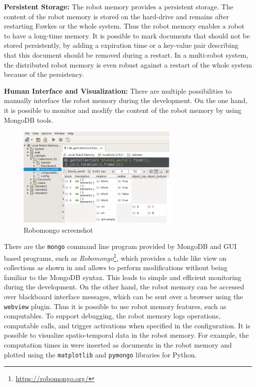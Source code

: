 \textbf{Persistent Storage:}
The robot memory provides a persistent storage. The content of the
robot memory is stored on the hard-drive and remains after restarting
Fawkes or the whole system. Thus the robot memory enables a robot to
have a long-time memory. It is possible to mark documents that should
not be stored persistently, by adding a expiration time or a key-value
pair describing that this document should be removed during a restart.
In a multi-robot system, the distributed robot memory is even robust against a
restart of the whole system because of the persistency.

\textbf{Human Interface and Visualization:}
There are multiple possibilities to manually interface the robot
memory during the development. On the one hand, it is possible to
monitor and modify the content of the robot memory by using MongoDB
tools.
\begin{figure}
  \centering
  \vspace{-4mm}
  \includegraphics[width=0.7\textwidth]{img/robomongo-small}%
  \caption[Robomongo screenshot]{Robomongo screenshot}
  \vspace{-5mm}
  \label{fig:robomongo}
\end{figure}
There are the \texttt{mongo} command line program provided by
MongoDB and GUI based programs, such as
\emph{Robomongo}\footnote{\url{https://robomongo.org/}}, which
provides a table like view on collections as shown in  and allows to perform
modifications without being familiar to the MongoDB syntax. This
leads to simple and efficient monitoring during the development.
On the other hand, the robot memory can be
accessed over blackboard interface messages, which can be sent over a
browser using the \texttt{webview} plugin. Thus it is possible to use
robot memory features, such as computables. To support debugging, the
robot memory logs operations, computable calls, and trigger
activations when specified in the configuration. It is possible to
visualize spatio-temporal data in the robot memory. For example, the
computation times in  were inserted as
documents in the robot memory and plotted using the
\texttt{matplotlib} and \texttt{pymongo} libraries for Python.

